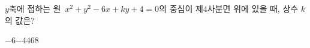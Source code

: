 $y$축에 접하는 원~$x^2+y^2-6x+ky+4=0$의 중심이 제$4$사분면 위에 있을 때, 상수 $k$의 값은?
\begin{choices32}{$-6$}{$-4$}{$4$}{$6$}{$8$}\end{choices32}
